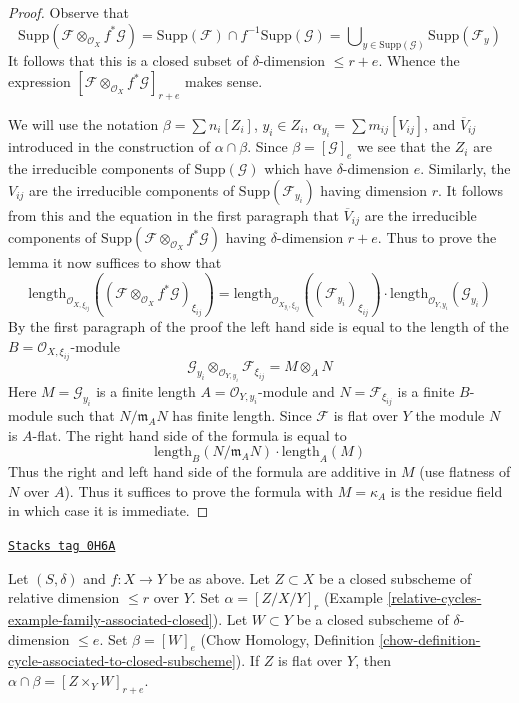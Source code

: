 \begin{proof}
Observe that
$$
\text{Supp}(\mathcal{F} \otimes_{\mathcal{O}_X} f^*\mathcal{G}) =
\text{Supp}(\mathcal{F}) \cap f^{-1}\text{Supp}(\mathcal{G}) =
\bigcup\nolimits_{y \in \text{Supp}(\mathcal{G})} \text{Supp}(\mathcal{F}_y)
$$
It follows that this is a closed subset of $\delta$-dimension $\leq r + e$.
Whence the expression
$[\mathcal{F} \otimes_{\mathcal{O}_X} f^*\mathcal{G}]_{r + e}$
makes sense.

\medskip\noindent
We will use the notation
$\beta = \sum n_i[Z_i]$, $y_i \in Z_i$,
$\alpha_{y_i} = \sum m_{ij} [V_{ij}]$, and
$\overline{V}_{ij}$ introduced in the construction
of $\alpha \cap \beta$. Since $\beta = [\mathcal{G}]_e$
we see that the $Z_i$ are the irreducible components of
$\text{Supp}(\mathcal{G})$ which have $\delta$-dimension $e$.
Similarly, the $V_{ij}$ are the irreducible components
of $\text{Supp}(\mathcal{F}_{y_i})$ having dimension $r$.
It follows from this and the equation in the first
paragraph that $\overline{V}_{ij}$ are the irreducible
components of
$\text{Supp}(\mathcal{F} \otimes_{\mathcal{O}_X} f^*\mathcal{G})$
having $\delta$-dimension $r + e$.
Thus to prove the lemma it now suffices to show that
$$
\text{length}_{\mathcal{O}_{X, \xi_{ij}}}(
(\mathcal{F} \otimes_{\mathcal{O}_X} f^*\mathcal{G})_{\xi_{ij}})
=
\text{length}_{\mathcal{O}_{X_{y_i}, \xi_{ij}}}((\mathcal{F}_{y_i})_{\xi_{ij}})
\cdot
\text{length}_{\mathcal{O}_{Y, y_i}}(\mathcal{G}_{y_i})
$$
By the first paragraph of the proof the left hand side is equal to
the length of the $B = \mathcal{O}_{X, \xi_{ij}}$-module
$$
\mathcal{G}_{y_i}
\otimes_{\mathcal{O}_{Y, y_i}}
\mathcal{F}_{\xi_{ij}} =
M \otimes_A N
$$
Here $M = \mathcal{G}_{y_i}$ is a finite length
$A = \mathcal{O}_{Y, y_i}$-module and $N = \mathcal{F}_{\xi_{ij}}$
is a finite $B$-module such that $N/\mathfrak m_AN$ has finite length.
Since $\mathcal{F}$ is flat over $Y$ the module $N$ is $A$-flat.
The right hand side of the formula is equal to
$$
\text{length}_B(N/\mathfrak m_A N) \cdot \text{length}_A(M)
$$
Thus the right and left hand side of the formula are additive in $M$
(use flatness of $N$ over $A$). Thus it suffices to prove the
formula with $M = \kappa_A$ is the residue field in which
case it is immediate.
\end{proof}

\begin{lemma}
\label{relative-cycles-lemma-action-closed}
\href{https://stacks.math.columbia.edu/tag/0H6A}{\texttt{Stacks tag 0H6A}}

Let $(S, \delta)$ and $f : X \to Y$ be as above. Let $Z \subset X$
be a closed subscheme of relative dimension $\leq r$ over $Y$.
Set $\alpha = [Z/X/Y]_r$ (Example \ref{relative-cycles-example-family-associated-closed}).
Let $W \subset Y$ be a closed subscheme of $\delta$-dimension $\leq e$.
Set $\beta = [W]_e$ (Chow Homology, Definition
\ref{chow-definition-cycle-associated-to-closed-subscheme}).
If $Z$ is flat over $Y$, then $\alpha \cap \beta = [Z \times_Y W]_{r + e}$.
\end{lemma}

